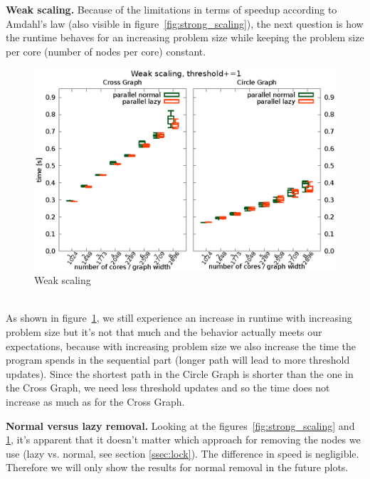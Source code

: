 \documentclass[letterpaper]{article}
\newcommand{\mypar}[1]{{\bf #1.}}
\begin{document}
\mypar{Weak scaling}
Because of the limitations in terms of speedup according to Amdahl's law (also visible in figure~\ref{fig:strong_scaling}), the next question is how the runtime behaves for an increasing problem size while keeping the problem size per core (number of nodes per core) constant.
\begin{figure}[h]\centering
  \includegraphics[scale=0.558]{weak_scaling.eps}
  \caption{Weak scaling\label{fig:weak_scaling}}
\end{figure}\\
As shown in figure~\ref{fig:weak_scaling}, we still experience an increase in runtime with increasing problem size but it's not that much and the behavior actually meets our expectations, because with increasing problem size we also increase the time the program spends in the sequential part (longer path will lead to more threshold updates). Since the shortest path in the Circle Graph is shorter than the one in the Cross Graph, we need less threshold updates and so the time does not increase as much as for the Cross Graph.

\mypar{Normal versus lazy removal} Looking at the figures~\ref{fig:strong_scaling} and \ref{fig:weak_scaling}, it's apparent that it doesn't matter which approach for removing the nodes we use (lazy vs. normal, see section \ref{ssec:lock}). The difference in speed is negligible. Therefore we will only show the results for normal removal in the future plots.
\end{document}
